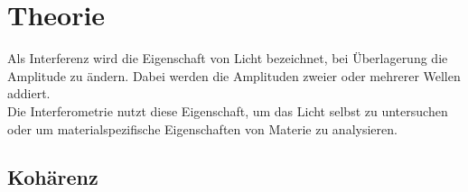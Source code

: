 \section{Theorie}
\label{sec:theorie}

Als Interferenz wird die Eigenschaft von Licht bezeichnet, bei Überlagerung die Amplitude zu ändern.
Dabei werden die Amplituden zweier oder mehrerer Wellen addiert.\\
Die Interferometrie nutzt diese Eigenschaft, um das Licht selbst zu untersuchen oder um materialspezifische Eigenschaften von Materie zu analysieren.

\subsection{Kohärenz}
